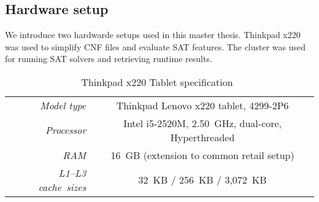 \begin{appendices}
\chapter{Hardware setup}
\label{app:setup}
%
We introduce two hardwarde setups used in this master thesis.
Thinkpad x220 was used
to simplify CNF files and evaluate SAT features. The cluster was used
for running SAT solvers and retrieving runtime results.

%
\newcommand\caches[1][L3]{L1--#1 cache~sizes}
\begin{table}[!ht]
  \begin{center}
    \begin{tabular}{rc}
      \hline
      \emph{Model type}            & Thinkpad Lenovo x220 tablet, 4299-2P6 \\
      \emph{Processor}             & Intel i5-2520M, 2.50~GHz, dual-core, Hyperthreaded \\
      \emph{RAM}                   & 16~GB (extension to common retail setup) \\
      \emph{\caches{}}             & 32~KB / 256~KB / 3,072~KB \\
      \hline
    \end{tabular}
    \caption{Thinkpad x220 Tablet specification~\cite{thinkpadx220}}
    \label{setup:thinkpadx220}
  \end{center}
\end{table}


\end{appendices}
